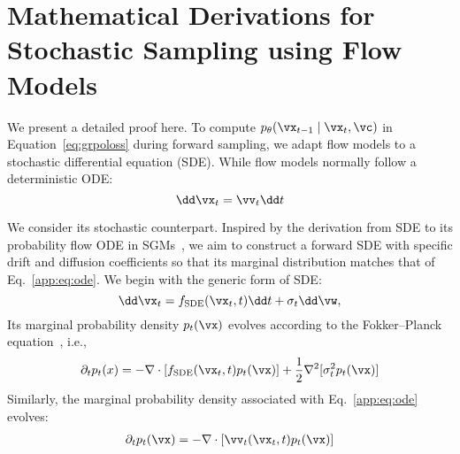 \section{Mathematical Derivations for Stochastic Sampling using Flow Models}\label{app:sec:math}

We present a detailed proof here. To compute $p_{\theta}(\vx_{t-1} \mid \vx_t, \vc)$ in Equation~\ref{eq:grpoloss} during forward sampling, we adapt flow models to a stochastic differential equation (SDE). While flow models normally follow a deterministic ODE:
\begin{equation}
    \dd \vx_t = \vv_t \dd t
    \label{app:eq:ode}
\end{equation}

We consider its stochastic counterpart. Inspired by the derivation from SDE to its probability flow ODE in SGMs~\cite{song2020score}, we aim to construct a forward SDE with specific drift and diffusion coefficients so that its marginal distribution matches that of Eq.~\ref{app:eq:ode}. We begin with the generic form of SDE:
\begin{equation}
    \dd \vx_t = f_{\text{SDE}}(\vx_t, t) \dd t + \sigma_t \dd \vw, 
    \label{app:eq:generic_sde}
\end{equation}
Its marginal probability density $p_t(\vx)$ evolves according to the Fokker–Planck equation~\cite{oksendal2003stochastic}, i.e.,
\begin{equation}
    \partial_{t}p_{t}(x) = -\nabla \cdot [f_{\text{SDE}}(\vx_t, t) p_{t}(\vx)] + \frac{1}{2}\nabla^{2}[\sigma_t^{2}p_{t}(\vx)]
    \label{app:eq:sde_fp}
\end{equation}
Similarly, the marginal probability density associated with Eq.~\ref{app:eq:ode} evolves: 
\begin{equation}
\begin{aligned}
\partial_{t}p_{t}(\vx) &= -\nabla \cdot [\vv_t(\vx_t, t) p_{t}(\vx)] \\
\end{aligned}
\label{app:eq:ode_fp}
\end{equation}

